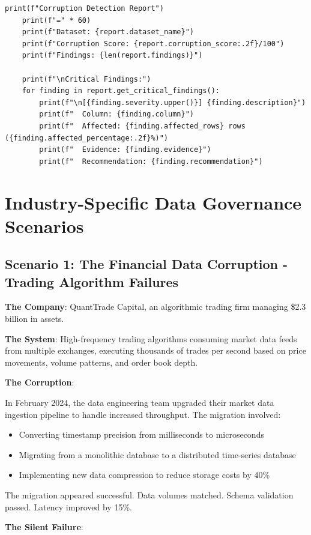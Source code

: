 \begin{lstlisting}[style=python, caption={Data corruption detection framework}]
    print(f"Corruption Detection Report")
    print(f"=" * 60)
    print(f"Dataset: {report.dataset_name}")
    print(f"Corruption Score: {report.corruption_score:.2f}/100")
    print(f"Findings: {len(report.findings)}")

    print(f"\nCritical Findings:")
    for finding in report.get_critical_findings():
        print(f"\n[{finding.severity.upper()}] {finding.description}")
        print(f"  Column: {finding.column}")
        print(f"  Affected: {finding.affected_rows} rows ({finding.affected_percentage:.2f}%)")
        print(f"  Evidence: {finding.evidence}")
        print(f"  Recommendation: {finding.recommendation}")
\end{lstlisting}

\section{Industry-Specific Data Governance Scenarios}

\subsection{Scenario 1: The Financial Data Corruption - Trading Algorithm Failures}

\textbf{The Company}: QuantTrade Capital, an algorithmic trading firm managing \$2.3 billion in assets.

\textbf{The System}: High-frequency trading algorithms consuming market data feeds from multiple exchanges, executing thousands of trades per second based on price movements, volume patterns, and order book depth.

\textbf{The Corruption}:

In February 2024, the data engineering team upgraded their market data ingestion pipeline to handle increased throughput. The migration involved:
\begin{itemize}
    \item Converting timestamp precision from milliseconds to microseconds
    \item Migrating from a monolithic database to a distributed time-series database
    \item Implementing new data compression to reduce storage costs by 40\%
\end{itemize}

The migration appeared successful. Data volumes matched. Schema validation passed. Latency improved by 15\%.

\textbf{The Silent Failure}:

